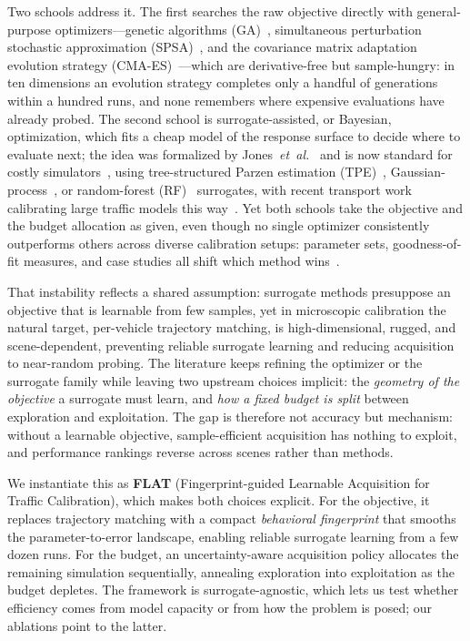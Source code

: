 \documentclass[conference]{IEEEtran}
\begin{document}
Two schools address it. The first searches the raw objective directly with general-purpose optimizers---genetic algorithms (GA)~\cite{ref_ga}, simultaneous perturbation stochastic approximation (SPSA)~\cite{ref_spsa}, and the covariance matrix adaptation evolution strategy (CMA-ES)~\cite{ref_cmaes}---which are derivative-free but sample-hungry: in ten dimensions an evolution strategy completes only a handful of generations within a hundred runs, and none remembers where expensive evaluations have already probed. The second school is surrogate-assisted, or Bayesian, optimization, which fits a cheap model of the response surface to decide where to evaluate next; the idea was formalized by Jones~\textit{et~al.}~\cite{ref_surrogate2} and is now standard for costly simulators~\cite{ref_surrogate1}, using tree-structured Parzen estimation (TPE)~\cite{ref_tpe,ref_optuna}, Gaussian-process~\cite{ref_pracbo}, or random-forest (RF)~\cite{ref_rf} surrogates, with recent transport work calibrating large traffic models this way~\cite{ref_bocal,ref_aical,ref_bo4mob}. Yet both schools take the objective and the budget allocation as given, even though no single optimizer consistently outperforms others across diverse calibration setups: parameter sets, goodness-of-fit measures, and case studies all shift which method wins~\cite{ref_calibration}.

That instability reflects a shared assumption: surrogate methods presuppose an objective that is learnable from few samples, yet in microscopic calibration the natural target, per-vehicle trajectory matching, is high-dimensional, rugged, and scene-dependent, preventing reliable surrogate learning and reducing acquisition to near-random probing. The literature keeps refining the optimizer or the surrogate family while leaving two upstream choices implicit: the \emph{geometry of the objective} a surrogate must learn, and \emph{how a fixed budget is split} between exploration and exploitation. The gap is therefore not accuracy but mechanism: without a learnable objective, sample-efficient acquisition has nothing to exploit, and performance rankings reverse across scenes rather than methods.

We instantiate this as \textbf{FLAT} (Fingerprint-guided Learnable Acquisition for Traffic Calibration), which makes both choices explicit. For the objective, it replaces trajectory matching with a compact \emph{behavioral fingerprint} that smooths the parameter-to-error landscape, enabling reliable surrogate learning from a few dozen runs. For the budget, an uncertainty-aware acquisition policy allocates the remaining simulation sequentially, annealing exploration into exploitation as the budget depletes. The framework is surrogate-agnostic, which lets us test whether efficiency comes from model capacity or from how the problem is posed; our ablations point to the latter.
\end{document}

